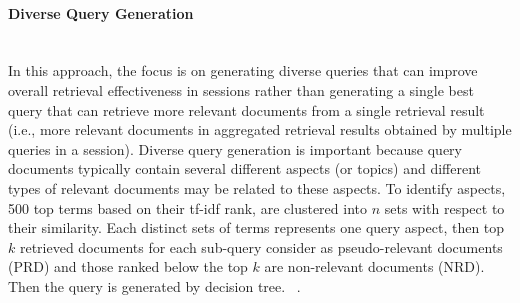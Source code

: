 \paragraph{Diverse Query Generation}
\ \\
In this approach, the focus is on generating diverse queries that can improve overall retrieval effectiveness in sessions rather than generating a single best query that can retrieve more relevant documents from a single retrieval result (i.e., more relevant documents in aggregated retrieval results obtained by multiple queries in a session). Diverse query generation is important because query documents typically contain several different aspects (or topics) and different types of relevant documents may be related to these aspects. To identify aspects, 500 top terms based on their tf-idf rank, are clustered into $ n $ sets with respect to their similarity. Each distinct sets of terms represents one query aspect, then top $ k $ retrieved documents for each sub-query consider as pseudo-relevant documents (PRD) and those ranked below the top $ k $ are non-relevant documents (NRD). Then the query is generated by decision tree. ~\citep{kim2014searching, kim2014diversifying}.
